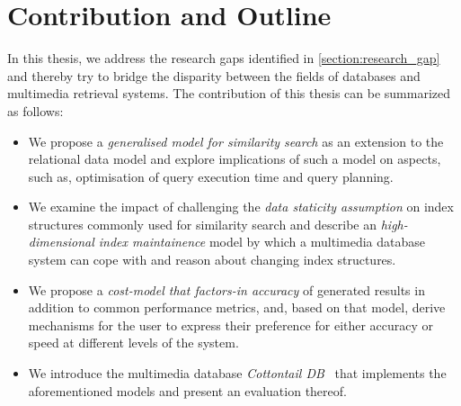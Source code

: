 


\section{Contribution and Outline}
\label{section:contributions}

In this thesis, we address the research gaps identified in \cref{section:research_gap} and thereby try to bridge the disparity between the fields of databases and multimedia retrieval systems. The contribution of this thesis can be summarized as follows:

\begin{itemize}
    \item We propose a \emph{generalised model for similarity search} as an extension to the relational data model and explore implications of such a model on aspects, such as, optimisation of query execution time and query planning.
    \item We examine the impact of challenging the \emph{data staticity assumption} on index structures commonly used for similarity search and describe an \emph{high-dimensional index maintainence} model by which a multimedia database system can cope with and reason about changing index structures.
    \item We propose a \emph{cost-model that factors-in accuracy} of generated results in addition to common performance metrics, and, based on that model, derive mechanisms for the user to express their preference for either accuracy or speed at different levels of the system.
    \item We introduce the multimedia database \emph{Cottontail DB}~\cite{Gasser:2020Cottontail} that implements the aforementioned models and present an evaluation thereof.
\end{itemize}

